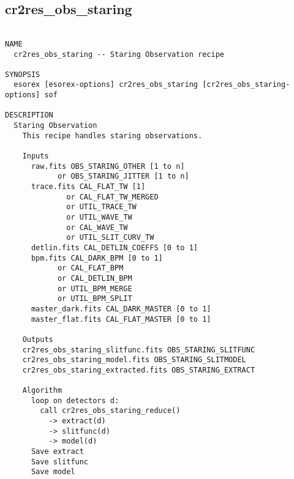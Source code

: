 \subsection{cr2res\_obs\_staring}
\begin{verbatim}

NAME
  cr2res_obs_staring -- Staring Observation recipe

SYNOPSIS
  esorex [esorex-options] cr2res_obs_staring [cr2res_obs_staring-options] sof

DESCRIPTION
  Staring Observation                                                     
    This recipe handles staring observations.                             
                                                                          
    Inputs                                                                
      raw.fits OBS_STARING_OTHER [1 to n]                   
            or OBS_STARING_JITTER [1 to n]                  
      trace.fits CAL_FLAT_TW [1]                       
              or CAL_FLAT_TW_MERGED                    
              or UTIL_TRACE_TW                         
              or UTIL_WAVE_TW                          
              or CAL_WAVE_TW                           
              or UTIL_SLIT_CURV_TW                     
      detlin.fits CAL_DETLIN_COEFFS [0 to 1]           
      bpm.fits CAL_DARK_BPM [0 to 1]                   
            or CAL_FLAT_BPM                            
            or CAL_DETLIN_BPM                          
            or UTIL_BPM_MERGE                          
            or UTIL_BPM_SPLIT                          
      master_dark.fits CAL_DARK_MASTER [0 to 1]        
      master_flat.fits CAL_FLAT_MASTER [0 to 1]        
                                                                          
    Outputs                                                               
  	cr2res_obs_staring_slitfunc.fits OBS_STARING_SLITFUNC
  	cr2res_obs_staring_model.fits OBS_STARING_SLITMODEL
  	cr2res_obs_staring_extracted.fits OBS_STARING_EXTRACT
                                                                          
    Algorithm                                                             
      loop on detectors d:                                                
        call cr2res_obs_staring_reduce()                                  
          -> extract(d)                                                   
          -> slitfunc(d)                                                  
          -> model(d)                                                     
      Save extract                                                        
      Save slitfunc                                                       
      Save model                                                          
                                                                          

\end{verbatim}
